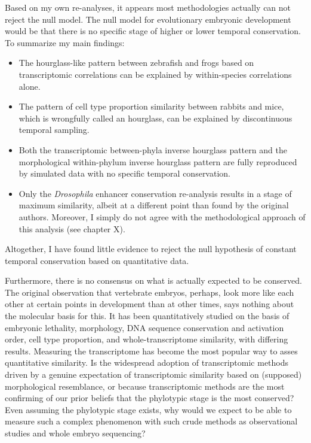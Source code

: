 Based on my own re-analyses, it appears most methodologies actually can not reject the null model. The null model for evolutionary embryonic development would be that there is no specific stage of higher or lower temporal conservation. To summarize my main findings:
\begin{itemize}
    \item The hourglass-like pattern between zebrafish and frogs based on transcriptomic correlations can be explained by within-species correlations alone.
    \item The pattern of cell type proportion similarity between rabbits and mice, which is wrongfully called an hourglass, can be explained by discontinuous temporal sampling.
    \item Both the transcriptomic between-phyla inverse hourglass pattern and the morphological within-phylum inverse hourglass pattern are fully reproduced by simulated data with no specific temporal conservation.
    \item Only the \textit{Drosophila} enhancer conservation re-analysis results in a stage of maximum similarity, albeit at a different point than found by the original authors. Moreover, I simply do not agree with the methodological approach of this analysis (see chapter X).
\end{itemize}
\noindent
Altogether, I have found little evidence to reject the null hypothesis of constant temporal conservation based on quantitative data.

Furthermore, there is no consensus on what is actually expected to be conserved. The original observation that vertebrate embryos, perhaps, look more like each other at certain points in development than at other times, says nothing about the molecular basis for this. It has been quantitatively studied on the basis of embryonic lethality\cite{Uchida2018}, morphology\cite{OlafRP2003,Cordero2020}, DNA sequence conservation\cite{Piasecka2013,Quint2012,Liu2021} and activation order\cite{Uesaka2019}, cell type proportion\cite{Mayshar2023}, and whole-transcriptome similarity\cite{Piasecka2013,Irie2011,marletaz2018,Liu2020,Leong2021,PerezPosada2022,Kalinka2010}, with differing results. Measuring the transcriptome has become the most popular way to asses quantitative similarity. Is the widespread adoption of transcriptomic methods driven by a genuine expectation of transcriptomic similarity based on (supposed) morphological resemblance, or because transcriptomic methods are the most confirming of our prior beliefs that the phylotypic stage is the most conserved? Even assuming the phylotypic stage exists, why would we expect to be able to measure such a complex phenomenon with such crude methods as observational studies and whole embryo sequencing?

